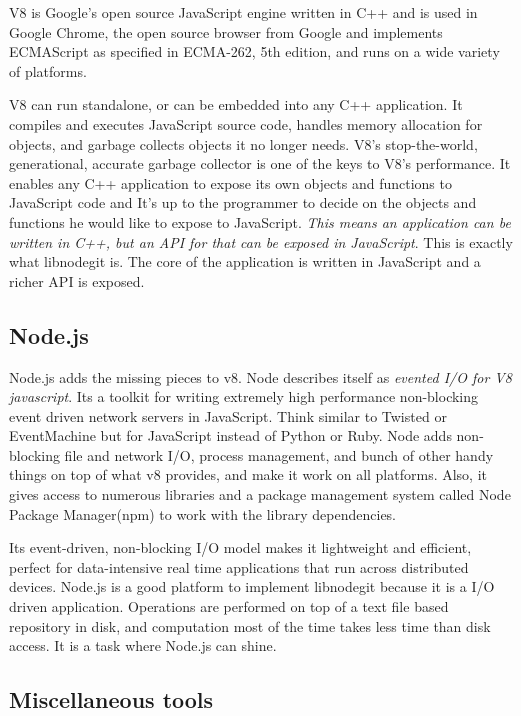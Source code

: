 V8 is Google's open source JavaScript engine written in C++ and is used in
Google Chrome, the open source browser from Google and implements ECMAScript as
specified in ECMA-262, 5th edition, and runs on a wide variety of platforms.

V8 can run standalone, or can be embedded into any C++ application. It compiles
and executes JavaScript source code, handles memory allocation for objects, and
garbage collects objects it no longer needs. V8’s stop-the-world, generational,
accurate garbage collector is one of the keys to V8’s performance. It enables
any C++ application to expose its own objects and functions to JavaScript code
and It’s up to the programmer to decide on the objects and functions he would
like to expose to JavaScript. \textit{This means an application can be written
  in C++, but an API for that can be exposed in JavaScript}. This is exactly
what libnodegit is. The core of the application is written in JavaScript and a
richer API is exposed.

\subsection{Node.js }

Node.js adds the missing pieces to v8. Node describes itself as \textit{evented
  I/O for V8 javascript}. Its a toolkit for writing extremely high performance
non-blocking event driven network servers in JavaScript. Think similar to
Twisted\cite{twisted} or EventMachine\cite{eventmachine} but for JavaScript
instead of Python or Ruby. Node adds non-blocking file and network I/O, process
management, and bunch of other handy things on top of what v8 provides, and make
it work on all platforms. Also, it gives access to numerous libraries and a
package management system called Node Package Manager(npm)\cite{npm} to work
with the library dependencies.

Its event-driven, non-blocking I/O model makes it lightweight and efficient,
perfect for data-intensive real time applications that run across distributed
devices. Node.js is a good platform to implement libnodegit because it is a I/O
driven application. Operations are performed on top of a text file based
repository in disk, and computation most of the time takes less time than disk
access. It is a task where Node.js can shine.

\subsection{Miscellaneous tools}

